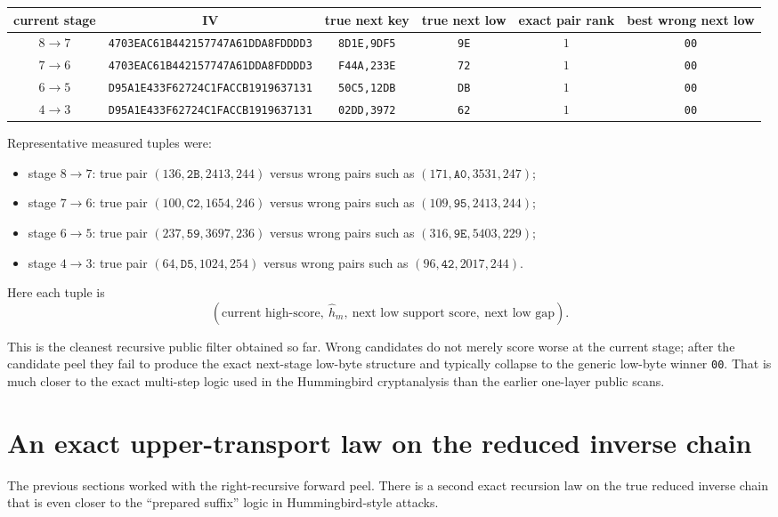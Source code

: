 \documentclass[11pt]{article}
\begin{document}
\begin{center}
\begin{tabular}{cccccc}
\toprule
current stage & IV & true next key & true next low & exact pair rank & best wrong next low \\
\midrule
$8 \rightarrow 7$ & \texttt{4703EAC61B442157747A61DDA8FDDDD3} & \texttt{8D1E,9DF5} & \texttt{9E} & $1$ & \texttt{00} \\
$7 \rightarrow 6$ & \texttt{4703EAC61B442157747A61DDA8FDDDD3} & \texttt{F44A,233E} & \texttt{72} & $1$ & \texttt{00} \\
$6 \rightarrow 5$ & \texttt{D95A1E433F62724C1FACCB1919637131} & \texttt{50C5,12DB} & \texttt{DB} & $1$ & \texttt{00} \\
$4 \rightarrow 3$ & \texttt{D95A1E433F62724C1FACCB1919637131} & \texttt{02DD,3972} & \texttt{62} & $1$ & \texttt{00} \\
\bottomrule
\end{tabular}
\end{center}

Representative measured tuples were:
\begin{itemize}
\item stage $8 \rightarrow 7$: true pair $(136,\texttt{2B},2413,244)$ versus wrong pairs such as $(171,\texttt{A0},3531,247)$;
\item stage $7 \rightarrow 6$: true pair $(100,\texttt{C2},1654,246)$ versus wrong pairs such as $(109,\texttt{95},2413,244)$;
\item stage $6 \rightarrow 5$: true pair $(237,\texttt{59},3697,236)$ versus wrong pairs such as $(316,\texttt{9E},5403,229)$;
\item stage $4 \rightarrow 3$: true pair $(64,\texttt{D5},1024,254)$ versus wrong pairs such as $(96,\texttt{42},2017,244)$.
\end{itemize}
Here each tuple is
\[
(\text{current high-score},\ \widehat{h}_m,\ \text{next low support score},\ \text{next low gap}).
\]

This is the cleanest recursive public filter obtained so far. Wrong candidates do not merely score worse at the current stage; after the candidate peel they fail to produce the exact next-stage low-byte structure and typically collapse to the generic low-byte winner \texttt{00}. That is much closer to the exact multi-step logic used in the Hummingbird cryptanalysis than the earlier one-layer public scans.

\section{An exact upper-transport law on the reduced inverse chain}
The previous sections worked with the right-recursive forward peel. There is a second exact recursion law on the true reduced inverse chain that is even closer to the ``prepared suffix'' logic in Hummingbird-style attacks.
\end{document}
